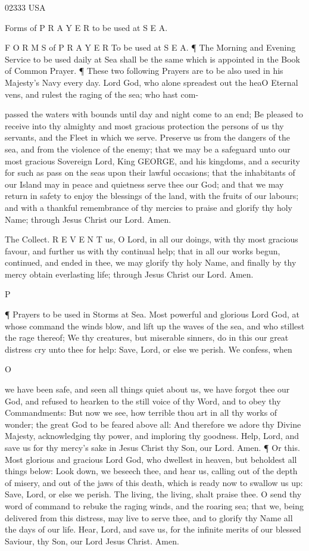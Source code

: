 02333 USA

Forms of P R A Y E R to be used at S E A.

F O R M S of P R A Y E R To be used at S E A. ¶ The Morning and Evening Service to be used daily at Sea shall be the same which is appointed in the Book of Common Prayer. ¶ These two following Prayers are to be also used in his Majesty’s Navy every day. Lord God, who alone spreadest out the heaO Eternal vens, and rulest the raging of the sea; who hast com-

passed the waters with bounds until day and night come to an end; Be pleased to receive into thy almighty and most gracious protection the persons of us thy servants, and the Fleet in which we serve. Preserve us from the dangers of the sea, and from the violence of the enemy; that we may be a safeguard unto our most gracious Sovereign Lord, King GEORGE, and his kingdoms, and a security for such as pass on the seas upon their lawful occasions; that the inhabitants of our Island may in peace and quietness serve thee our God; and that we may return in safety to enjoy the blessings of the land, with the fruits of our labours; and with a thankful remembrance of thy mercies to praise and glorify thy holy Name; through Jesus Christ our Lord. Amen.

The Collect. R E V E N T us, O Lord, in all our doings, with thy most gracious favour, and further us with thy continual help; that in all our works begun, continued, and ended in thee, we may glorify thy holy Name, and finally by thy mercy obtain everlasting life; through Jesus Christ our Lord. Amen.

P

¶ Prayers to be used in Storms at Sea. Most powerful and glorious Lord God, at whose command the winds blow, and lift up the waves of the sea, and who stillest the rage thereof; We thy creatures, but miserable sinners, do in this our great distress cry unto thee for help: Save, Lord, or else we perish. We confess, when

O

we have been safe, and seen all things quiet about us, we have forgot thee our God, and refused to hearken to the still voice of thy Word, and to obey thy Commandments: But now we see, how terrible thou art in all thy works of wonder; the great God to be feared above all: And therefore we adore thy Divine Majesty, acknowledging thy power, and imploring thy goodness. Help, Lord, and save us for thy mercy's sake in Jesus Christ thy Son, our Lord. Amen. ¶ Or this. Most glorious and gracious Lord God, who dwellest in heaven, but beholdest all things below: Look down, we beseech thee, and hear us, calling out of the depth of misery, and out of the jaws of this death, which is ready now to swallow us up: Save, Lord, or else we perish. The living, the living, shalt praise thee. O send thy word of command to rebuke the raging winds, and the roaring sea; that we, being delivered from this distress, may live to serve thee, and to glorify thy Name all the days of our life. Hear, Lord, and save us, for the infinite merits of our blessed Saviour, thy Son, our Lord Jesus Christ. Amen.

